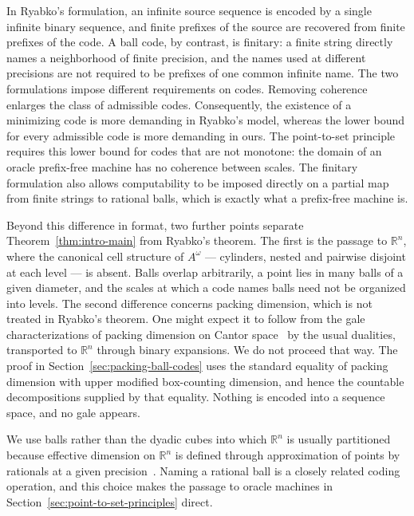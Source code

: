 \documentclass[a4paper,oneside,reqno,12pt]{amsart}
\theoremstyle{plain}
\theoremstyle{definition}
\theoremstyle{remark}
\begin{document}
In Ryabko's formulation, an infinite source sequence is encoded by a single
infinite binary sequence, and finite prefixes of the source are recovered from
finite prefixes of the code.
A ball code, by contrast, is finitary: a finite
string directly names a neighborhood of finite precision, and the names used at
different precisions are not required to be prefixes of one common infinite
name.  The two formulations impose different requirements on codes.
Removing coherence enlarges the class of admissible codes.
Consequently, the existence
of a minimizing code is more demanding in Ryabko's model, whereas the lower
bound for every admissible code is more demanding in ours.
The point-to-set principle requires this lower bound for codes that are not
monotone: the domain of an oracle prefix-free machine has no coherence between
scales.
The finitary formulation also allows computability to be
imposed directly on a partial map from finite strings to rational balls, which
is exactly what a prefix-free machine is.

Beyond this difference in format, two further points separate Theorem~\ref{thm:intro-main} from Ryabko's theorem.  The first
is the passage to \(\mathbb R^n\), where the canonical cell structure of
\(A^\omega\) --- cylinders, nested and pairwise disjoint at each level --- is
absent.  Balls overlap arbitrarily, a point lies in many balls of a given
diameter, and the scales at which a code names balls need not be organized into
levels.  The second difference concerns packing dimension, which is not treated
in Ryabko's theorem.  One might expect it to follow from the gale
characterizations of packing dimension on
Cantor space~\cite{AthreyaHitchcockLutzMayordomo2007} by the usual dualities,
transported to \(\mathbb R^n\) through binary expansions.  We do not proceed that
way.  The proof in Section~\ref{sec:packing-ball-codes} uses the standard equality
of packing dimension with upper modified box-counting dimension, and hence the
countable decompositions supplied by that equality.  Nothing is encoded into a
sequence space, and no gale appears.

We use balls rather than the dyadic cubes into which \(\mathbb R^n\) is usually
partitioned because effective dimension on \(\mathbb R^n\) is defined through
approximation of points by rationals at a given
precision~\cite{LutzMayordomo2008}.
Naming a rational ball is a closely related
coding operation, and this choice makes the passage to oracle machines in
Section~\ref{sec:point-to-set-principles} direct.
\end{document}
